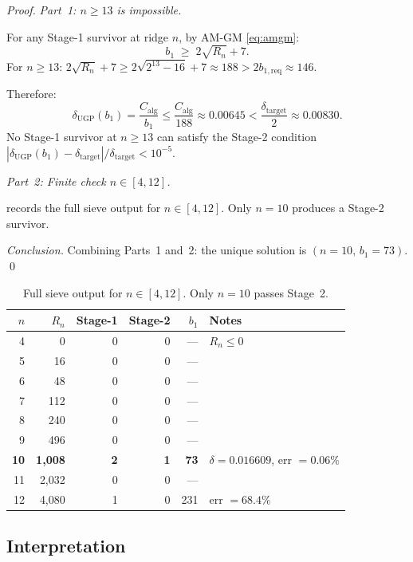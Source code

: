 \documentclass[11pt]{article}
\theoremstyle{remark}
\newcommand{\bone}{b_1}
\newcommand{\bonereq}{b_{1,\mathrm{req}}}
\newcommand{\deltaNUGP}{\delta_{\mathrm{UGP}}}
\newcommand{\deltatar}{\delta_{\mathrm{target}}}
\newcommand{\Calg}{C_{\mathrm{alg}}}
\begin{document}
\begin{proof}
\textit{Part~1: $n \geq 13$ is impossible.}

For any Stage-1 survivor at ridge $n$, by AM-GM \eqref{eq:amgm}:
\[
  \bone \;\geq\; 2\sqrt{R_n} + 7.
\]
For $n \geq 13$: $2\sqrt{R_n} + 7 \geq 2\sqrt{2^{13}-16} + 7 \approx 188 > 2\bonereq \approx 146$.

Therefore:
\[
  \deltaNUGP(\bone) = \frac{\Calg}{\bone} \leq \frac{\Calg}{188} \approx 0.00645 < \frac{\deltatar}{2} \approx 0.00830.
\]
No Stage-1 survivor at $n \geq 13$ can satisfy the Stage-2 condition
$|\deltaNUGP(\bone) - \deltatar|/\deltatar < 10^{-5}$.

\medskip\noindent
\textit{Part~2: Finite check $n \in [4,12]$.}

 records the full sieve output for $n \in [4,12]$.
Only $n{=}10$ produces a Stage-2 survivor.

\medskip\noindent
\textit{Conclusion.}
Combining Parts~1 and~2: the unique solution is $(n{=}10,\,\bone{=}73)$.
\qed
\end{proof}

\begin{table}[H]
\centering
\caption{Full sieve output for $n \in [4,12]$. Only $n{=}10$ passes Stage~2.}
\label{tab:sieve}
\small
\begin{tabular}{rrrrrl}
\toprule
$n$ & $R_n$ & Stage-1 & Stage-2 & $\bone$ & Notes \\
\midrule
4  &        0 & 0 & 0 & --- & $R_n \leq 0$ \\
5  &       16 & 0 & 0 & --- & \\
6  &       48 & 0 & 0 & --- & \\
7  &      112 & 0 & 0 & --- & \\
8  &      240 & 0 & 0 & --- & \\
9  &      496 & 0 & 0 & --- & \\
\textbf{10} & \textbf{1,008} & \textbf{2} & \textbf{1} & \textbf{73} &
  $\delta = 0.016609$, err $= 0.06\%$ \\
11 &    2,032 & 0 & 0 & --- & \\
12 &    4,080 & 1 & 0 & 231 & err $= 68.4\%$ \\
\bottomrule
\end{tabular}
\end{table}

\subsection{Interpretation}
\end{document}
